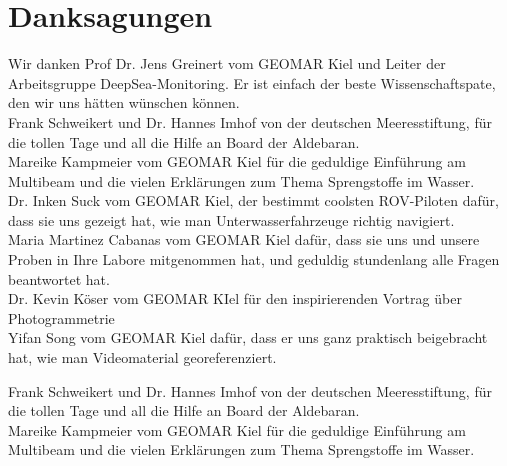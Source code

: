  

\chapter[Danksagungen]{Danksagungen}
Wir danken Prof Dr. Jens Greinert vom GEOMAR Kiel und Leiter der Arbeitsgruppe DeepSea-Monitoring. Er ist einfach der beste Wissenschaftspate, den wir uns hätten wünschen können.\\


Frank Schweikert und Dr. Hannes Imhof von der deutschen Meeresstiftung, für die tollen Tage und all die Hilfe an Board der Aldebaran. \\


Mareike Kampmeier vom GEOMAR Kiel für die geduldige Einführung am Multibeam und die vielen Erklärungen zum Thema Sprengstoffe im Wasser. \\


Dr. Inken Suck vom GEOMAR Kiel, der bestimmt coolsten ROV-Piloten dafür, dass sie uns gezeigt hat, wie man Unterwasserfahrzeuge richtig navigiert. \\


Maria Martinez Cabanas vom GEOMAR Kiel dafür, dass sie uns und unsere Proben in Ihre Labore mitgenommen hat, und geduldig stundenlang alle Fragen beantwortet hat.\\

Dr. Kevin Köser vom GEOMAR KIel für den inspirierenden Vortrag über Photogrammetrie \\


Yifan Song vom GEOMAR Kiel dafür, dass er uns ganz praktisch beigebracht hat, wie man Videomaterial georeferenziert.



Frank Schweikert und Dr. Hannes Imhof von der deutschen Meeresstiftung, für die tollen Tage und all die Hilfe an Board der Aldebaran. \\



Mareike Kampmeier vom GEOMAR Kiel für die geduldige Einführung am Multibeam und die vielen Erklärungen zum Thema Sprengstoffe im Wasser. \\



